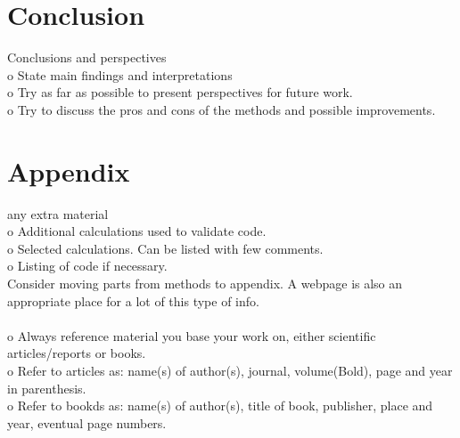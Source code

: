 \documentclass[12pt, a4paper]{scrartcl}
\begin{document}
\section{Conclusion}
    Conclusions and perspectives\\
    o   State main findings and interpretations \\
    o   Try as far as possible to present perspectives for future work. \\
    o   Try to discuss the pros and cons of the methods and possible improvements. \\
\section{Appendix}
    any extra material \\
    o   Additional calculations used to validate code. \\
    o   Selected calculations. Can be listed with few comments. \\
    o   Listing of code if necessary. \\
    Consider moving parts from methods to appendix. A webpage is also an appropriate place
    for a lot of this type of info. \\\\

    o   Always reference material you base your work on, either scientific articles/reports
        or books. \\
    o   Refer to articles as: name(s) of author(s), journal, volume(Bold), page and year in
        parenthesis. \\
    o   Refer to bookds as: name(s) of author(s), title of book, publisher, place and year, 
        eventual page numbers. \\


\end{document}
